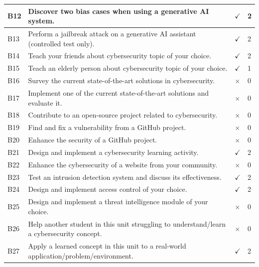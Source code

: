 \documentclass[titlepage]{article}
\begin{document}
\begin{center}
\begin{tabular}{ |p{4em}|p{30em}|C{6em}|C{5em}| }
            \hline
            B12 & Discover two bias cases when using a generative AI system. & $\checkmark$ & 2 \\
            \hline
            B13 & Perform a jailbreak attack on a generative AI assistant (controlled test only). & $\checkmark$ & 2 \\
            \hline
            B14 & Teach your friends about cybersecurity topic of your choice. & $\checkmark$ & 2 \\
            \hline
            B15 & Teach an elderly person about cybersecurity topic of your choice. & $\checkmark$ & 1 \\
            \hline
            B16 & Survey the current state-of-the-art solutions in cybersecurity. & $\times$ & 0 \\
            \hline
            B17 & Implement one of the current state-of-the-art solutions and evaluate it. & $\times$ & 0 \\
            \hline
            B18 & Contribute to an open-source project related to cybersecurity. & $\times$ & 0 \\
            \hline
            B19 & Find and fix a vulnerability from a GitHub project. & $\times$ & 0 \\
            \hline
            B20 & Enhance the security of a GitHub project. & $\times$ & 0 \\
            \hline
            B21 & Design and implement a cybersecurity learning activity. & $\checkmark$ & 2 \\
            \hline
            B22 & Enhance the cybersecurity of a website from your community. & $\times$ & 0 \\
            \hline
            B23 & Test an intrusion detection system and discuss its effectiveness. & $\checkmark$ & 2 \\
            \hline
            B24 & Design and implement access control of your choice. & $\checkmark$ & 2 \\
            \hline
            B25 & Design and implement a threat intelligence module of your choice. & $\times$ & 0 \\
            \hline
            B26 & Help another student in this unit struggling to understand/learn a cybersecurity concept. & $\times$ & 0 \\
            \hline
            B27 & Apply a learned concept in this unit to a real-world application/problem/environment. & $\checkmark$ & 2 \\
            \hline

\end{tabular}
\end{center}
\end{document}
